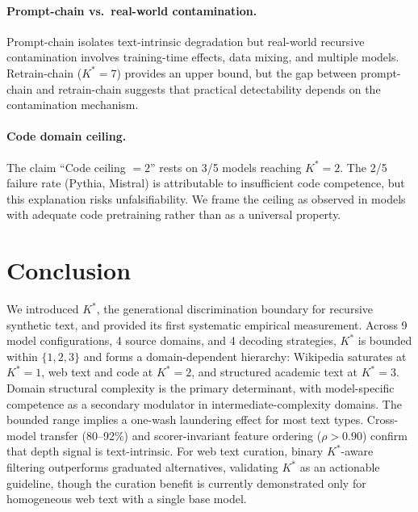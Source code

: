 \documentclass[11pt,a4paper]{article}
\begin{document}
\paragraph{Prompt-chain vs.\ real-world contamination.} Prompt-chain isolates text-intrinsic degradation but real-world recursive contamination involves training-time effects, data mixing, and multiple models. Retrain-chain ($K^*\!=\!7$) provides an upper bound, but the gap between prompt-chain and retrain-chain suggests that practical detectability depends on the contamination mechanism.

\paragraph{Code domain ceiling.} The claim ``Code ceiling $= 2$'' rests on 3/5 models reaching $K^*\!=\!2$. The 2/5 failure rate (Pythia, Mistral) is attributable to insufficient code competence, but this explanation risks unfalsifiability. We frame the ceiling as observed in models with adequate code pretraining rather than as a universal property.


\section{Conclusion}

We introduced $K^*$, the generational discrimination boundary for recursive synthetic text, and provided its first systematic empirical measurement. Across 9 model configurations, 4 source domains, and 4 decoding strategies, $K^*$ is bounded within $\{1, 2, 3\}$ and forms a domain-dependent hierarchy: Wikipedia saturates at $K^*\!=\!1$, web text and code at $K^*\!=\!2$, and structured academic text at $K^*\!=\!3$. Domain structural complexity is the primary determinant, with model-specific competence as a secondary modulator in intermediate-complexity domains. The bounded range implies a one-wash laundering effect for most text types. Cross-model transfer (80--92\%) and scorer-invariant feature ordering ($\rho > 0.90$) confirm that depth signal is text-intrinsic. For web text curation, binary $K^*$-aware filtering outperforms graduated alternatives, validating $K^*$ as an actionable guideline, though the curation benefit is currently demonstrated only for homogeneous web text with a single base model.
\end{document}
